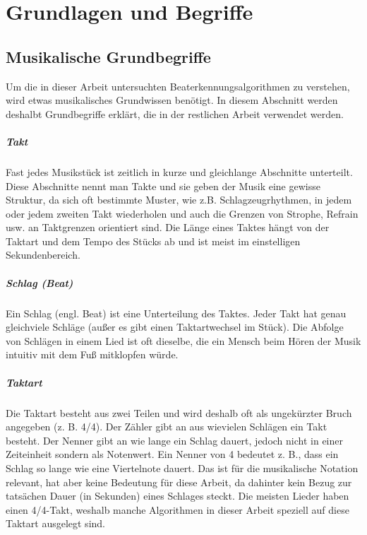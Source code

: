 \chapter{Grundlagen und Begriffe}
\label{grundlagen}

\section{Musikalische Grundbegriffe}
{
	Um die in dieser Arbeit untersuchten Beaterkennungsalgorithmen zu verstehen,
		wird etwas musikalisches Grundwissen benötigt.
	In diesem Abschnitt werden deshalbt Grundbegriffe erklärt,
		die in der restlichen Arbeit verwendet werden.

	\paragraph{Takt}
	{
		Fast jedes Musikstück ist zeitlich in kurze und gleichlange Abschnitte unterteilt.
		Diese Abschnitte nennt man Takte
			und sie geben der Musik eine gewisse Struktur,
			da sich oft bestimmte Muster, wie z.B. Schlagzeugrhythmen, in jedem oder jedem zweiten Takt wiederholen
			und auch die Grenzen von Strophe, Refrain usw. an Taktgrenzen orientiert sind.
		Die Länge eines Taktes hängt von der Taktart und dem Tempo des Stücks ab
			und ist meist im einstelligen Sekundenbereich.
	}

	\paragraph{Schlag (Beat)}
	{
		Ein Schlag (engl. Beat) ist eine Unterteilung des Taktes.
		Jeder Takt hat genau gleichviele Schläge (außer es gibt einen Taktartwechsel im Stück).
		Die Abfolge von Schlägen in einem Lied ist oft dieselbe,
			die ein Mensch beim Hören der Musik intuitiv mit dem Fuß mitklopfen würde.
	}

	\paragraph{Taktart}
	{
		Die Taktart besteht aus zwei Teilen
			und wird deshalb oft als ungekürzter Bruch angegeben (z. B. 4/4).
		Der Zähler gibt an aus wievielen Schlägen ein Takt besteht.
		Der Nenner gibt an wie lange ein Schlag dauert,
			jedoch nicht in einer Zeiteinheit sondern als Notenwert.
		Ein Nenner von 4 bedeutet z. B., dass ein Schlag so lange wie eine Viertelnote dauert.
		Das ist für die musikalische Notation relevant,
			hat aber keine Bedeutung für diese Arbeit,
			da dahinter kein Bezug zur tatsächen Dauer (in Sekunden) eines Schlages steckt.
		Die meisten Lieder haben einen 4/4-Takt,
			weshalb manche Algorithmen in dieser Arbeit speziell auf diese Taktart ausgelegt sind.
	}

}
